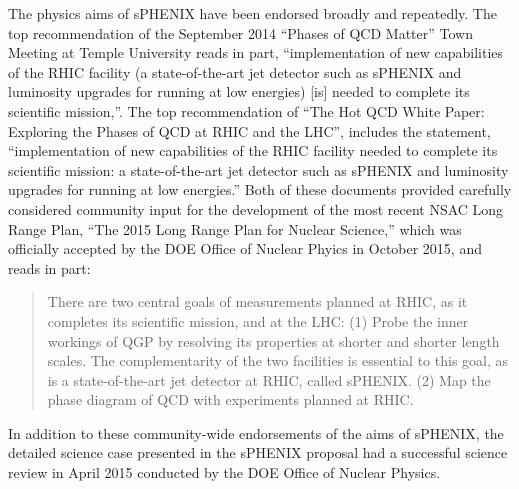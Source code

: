 The physics aims of sPHENIX have been endorsed broadly and repeatedly.
The top recommendation of the September 2014 “Phases of QCD Matter”
Town Meeting at Temple University reads in part, ``implementation of
new capabilities of the RHIC facility (a state-of-the-art jet detector
such as sPHENIX and luminosity upgrades for running at low energies)
[is] needed to complete its scientific mission,''.  The top
recommendation of ``The Hot QCD White Paper: Exploring the Phases of
QCD at RHIC and the LHC'', includes the statement, ``implementation of
new capabilities of the RHIC facility needed to complete its
scientific mission: a state-of-the-art jet detector such as sPHENIX
and luminosity upgrades for running at low energies.'' Both of these
documents provided carefully considered community input for the
development of the most recent NSAC Long Range Plan, ``The 2015 Long
Range Plan for Nuclear Science,'' which was officially accepted by the
DOE Office of Nuclear Phyics in October 2015, and reads in part:

\blockquote{There are two central goals of measurements planned at
  RHIC, as it completes its scientific mission, and at the LHC: (1)
  Probe the inner workings of QGP by resolving its properties at
  shorter and shorter length scales. The complementarity of the two
  facilities is essential to this goal, as is a state-of-the-art jet
  detector at RHIC, called sPHENIX. (2) Map the phase diagram of QCD
  with experiments planned at RHIC.}

In addition to these community-wide endorsements of the aims of
sPHENIX, the detailed science case presented in the sPHENIX proposal
had a successful science review in April 2015 conducted by the DOE
Office of Nuclear Physics.


